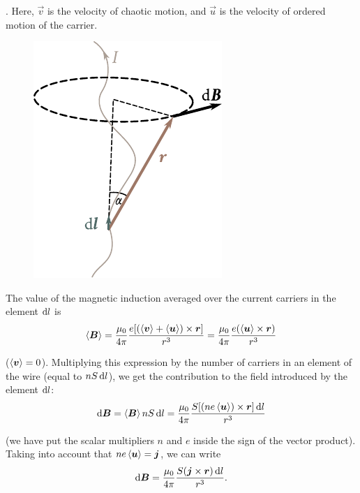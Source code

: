 . Here, $\vec{v}$ is the velocity of
chaotic motion, and $\vec{u}$ is the velocity of ordered motion of the carrier.

\begin{figure}[t]
	\begin{center}
		\includegraphics[scale=1]{figures/ch_06/fig_6_3.pdf}
		\caption[]{}
		\label{fig:6_3}
	\end{center}
	\vspace{-0.8cm}
\end{figure}

The value of the magnetic induction averaged over the current carriers in the element $\mathrm{d} l$ is
\begin{equation*}
    \left\langle \boldsymbol{B} \right\rangle = \frac{\mu_0}{4\pi} \frac{e [(\left\langle \boldsymbol{v} \right\rangle + \left\langle \boldsymbol{u} \right\rangle) \times \boldsymbol{r}]}{r^3} = \frac{\mu_0}{4\pi} \frac{e (\left\langle \boldsymbol{u} \right\rangle \times \boldsymbol{r})}{r^3}
\end{equation*}

\noindent
($\left\langle \boldsymbol{v} \right\rangle=0$). Multiplying this expression by the number of carriers in an element of the wire (equal to $nS\, \mathrm{d} l$), we get the contribution to the field introduced by the element $\mathrm{d} l$:
\begin{equation*}
    \mathrm{d}\boldsymbol{B} = \left\langle \boldsymbol{B} \right\rangle n S\, \mathrm{d} l = \frac{\mu_0}{4\pi} \frac{S [(ne\left\langle \boldsymbol{u} \right\rangle) \times \boldsymbol{r}]\, \mathrm{d} l}{r^3}
\end{equation*}

\noindent
(we have put the scalar multipliers $n$ and $e$ inside the sign of the vector product). Taking into account that $ne\left\langle \boldsymbol{u} \right\rangle=\boldsymbol{j}$, we can write
\begin{equation}\label{eq:6_26}
    \mathrm{d}\boldsymbol{B} = \frac{\mu_0}{4\pi} \frac{S (\boldsymbol{j}\times\boldsymbol{r})\, \mathrm{d} l}{r^3}.
\end{equation}

